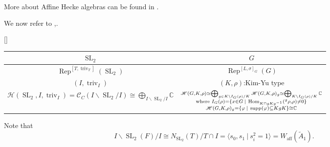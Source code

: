\documentclass[8pt]{article}
\DeclareMathOperator{\triv}{triv}
\DeclareMathOperator{\SL}{SL}
\DeclareMathOperator{\Rep}{Rep}
\DeclareMathOperator{\Hom}{Hom}
\DeclareMathOperator{\supp}{supp}
\newcommand{\C}[0]{\mathbb{C}}
\newcommand{\sep}[0]{\:|\:}
\newcommand{\hecke}[0]{\mathscr{H}}
\begin{document}
More about Affine Hecke algebras can be found in \cite{Soll}.
\par We now refer to \cite{Adl_1},\cite{Adl_!}. 
\begin{center}[]
\centering
\begin{tabular}{c|c}
$\SL_2$                                                                                          & $G$                                                                                                                                                                                                                                                                                                            \\ \hline
$\Rep^{[T,\triv_T]}(\SL_2)$                                                                      & $\Rep^{[L,\sigma]_G}(G)$                                                                                                                                                                                                                                                                                       \\ \hline
$(I,\triv_I)$                                                                                    & $(K,\rho)$:Kim-Yu type                                                                                                                                                                                                                                                                                         \\ \hline
$\hecke(\SL_2,I,\triv_I)=\mathcal{C}_C(I\backslash\SL_2/I)\cong\bigoplus_{I\backslash\SL_2/I}\C$ & $\substack{\hecke(G,K,\rho)\simeq\bigoplus_{g\in K\backslash I_G(\rho)/K}\hecke(G,K,\rho)_g\simeq\bigoplus_{K\backslash I_G(\rho)/K}\C\\\text{where }I_G(\rho)=\{x\in G\sep\Hom_{K\cap gKg^{-1}}(\prescript{g}{}{\rho},\rho)\not=0\}\\\hecke(G,K,\rho)_g = \{\varphi\sep\supp(\varphi)\subseteq KgK\}\cong\C}$
\end{tabular}
\end{center}

Note that 
\begin{equation*}
  I\backslash \SL_2(F)/I\cong N_{\SL_2}(T)/T\cap I = \langle s_0,s_1\sep s_i^2=1\rangle = W_{\text{aff}}(\widetilde{A}_1).
\end{equation*}
\end{document}
